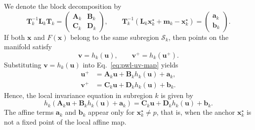 \documentclass{article}
\theoremstyle{example}
\theoremstyle{plain}
\theoremstyle{definition}
\theoremstyle{remark}
\def\eqref#1{equation~\ref{#1}}
\def\vm{{\bm{m}}}
\def\vx{{\bm{x}}}
\def\mA{{\bm{A}}}
\def\mB{{\bm{B}}}
\def\mC{{\bm{C}}}
\def\mD{{\bm{D}}}
\def\mL{{\bm{L}}}
\def\mT{{\bm{T}}}
\renewcommand{\eqref}[1]{Eq.~\ref{#1}}
\begin{document}
We denote the block decomposition by 
\begin{equation}
\mT_k^{-1} \mL_k \mT_k
=
\begin{pmatrix}
\mA_k & \mB_k \\
\mC_k & \mD_k
\end{pmatrix},
\qquad
\mT_k^{-1}(\mL_k \vx_k^\star + \vm_k - \vx_k^\star)
=
\begin{pmatrix}
\bm{a}_k \\ \bm{b}_k
\end{pmatrix}.
\end{equation}
If both $\vx$ and $F(\vx)$ belong to the same subregion $\mathcal S_k$, then
points on the manifold satisfy 
\begin{equation}
\bm{v} = h_k(\bm{u}),
\qquad
\bm{v}^+ = h_k(\bm{u}^+).
\end{equation}
Substituting $\bm{v}=h_k(\bm{u})$ into \eqref{eq:pwl-uv-map} yields 
\begin{align}
\bm{u}^+ &= \mA_k \bm{u} + \mB_k h_k(\bm{u}) + \bm{a}_k, \\
\bm{v}^+ &= \mC_k \bm{u} + \mD_k h_k(\bm{u}) + \bm{b}_k .
\end{align}
Hence, the local invariance equation in subregion $k$ is given by 
\begin{equation}
h_k\!\left(\mA_k \bm{u} + \mB_k h_k(\bm{u}) + \bm{a}_k\right)
=
\mC_k \bm{u} + \mD_k h_k(\bm{u}) + \bm{b}_k .
\label{eq:pwl-invariance-same}
\end{equation}
The affine terms $\bm{a}_k$ and $\bm{b}_k$ appear only for $\vx_k^\star \neq p$, that is, when the anchor $\vx_k^\star$ is not a fixed point of the local affine map. 
\end{document}
